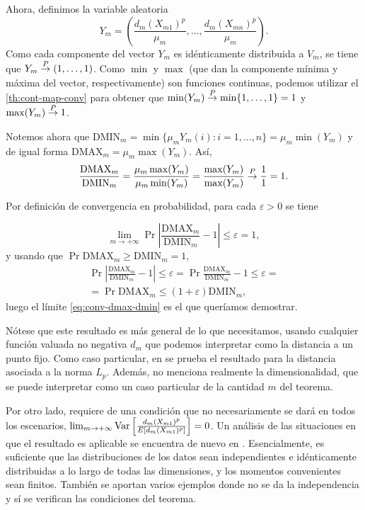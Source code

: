 Ahora, definimos la variable aleatoria
\[Y_m=\left(\frac{d_m(X_{m1})^p}{\mu_m}, \dots, \frac{d_m(X_{mn})^p}{\mu_m}\right).\]
Como cada componente del vector \(Y_m\) es idénticamente distribuida a
\(V_m\), se tiene que \(Y_m\overset{P}{\rightarrow} (1, \dots, 1)\). Como \(\min\) y
\(\max\) (que dan la componente mínima y máxima del vector,
respectivamente) son funciones continuas, podemos utilizar el \autoref{th:cont-map-conv} para obtener que
\(\min(Y_m)\overset{P}{\rightarrow} \min\{1, \dots, 1\} = 1\) y \(\max(Y_m)\overset{P}{\rightarrow} 1\).

Notemos ahora que
\(\mathrm{DMIN}_m= \min\{\mu_m Y_m(i):i=1,\dots,n\}=\mu_m \min(Y_m)\) y
de igual forma \(\mathrm{DMAX}_m=\mu_m \max(Y_m)\). Así,
\[ \frac{\mathrm{DMAX}_m}{\mathrm{DMIN}_m}=\frac{\mu_m \max(Y_m)}{\mu_m \min(Y_m)}=\frac{\max(Y_m)}{\max(Y_m)}\overset{P}{\rightarrow} \frac 1 1= 1.\]

Por definición de convergencia en probabilidad, para cada
\(\varepsilon>0\) se tiene

\begin{equation}
  \label{eq:conv-dmax-dmin}
  \lim_{m\rightarrow +\infty} \Pr{\left\lvert \frac{\mathrm{DMAX}_m}{\mathrm{DMIN}_m} - 1 \right\rvert\leq\varepsilon} = 1,
  \end{equation}
y usando que \(\Pr{\mathrm{DMAX}_m \geq \mathrm{DMIN}_m}=1\),
\begin{gather*}
  \Pr{\left\lvert \frac{\mathrm{DMAX}_m}{\mathrm{DMIN}_m} - 1 \right\rvert\leq\varepsilon}=
\Pr{\frac{\mathrm{DMAX}_m}{\mathrm{DMIN}_m} - 1 \leq\varepsilon}=\\=
\Pr{\mathrm{DMAX}_m\leq (1+ \varepsilon)\mathrm{DMIN}_m },
\end{gather*}
luego el límite \eqref{eq:conv-dmax-dmin} es el que queríamos demostrar.
\proofe
\theoe

Nótese que este resultado es más general de lo que necesitamos, usando
cualquier función valuada no negativa \(d_m\) que podemos interpretar
como la distancia a un punto fijo. Como caso particular, en
\textcite{aggarwal2001} se prueba el resultado para la distancia
asociada a la norma \(L_p\). Además, no menciona realmente la
dimensionalidad, que se puede interpretar como un caso particular de la
cantidad \(m\) del teorema.

Por otro lado, requiere de una condición que no necesariamente se dará
en todos los escenarios,
\(\lim_{m\rightarrow +\infty}\mathrm{Var}\left[\frac{d_m(X_{m1})^p}{E[d_m(X_{m1})^p]}\right]=0\).
Un análisis de las situaciones en que el resultado es aplicable se
encuentra de nuevo en \textcite{beyer1999}. Esencialmente, es suficiente
que las distribuciones de los datos sean independientes e idénticamente
distribuidas a lo largo de todas las dimensiones, y los momentos
convenientes sean finitos. También se aportan varios ejemplos donde no se
da la independencia y sí se verifican las condiciones del teorema.

